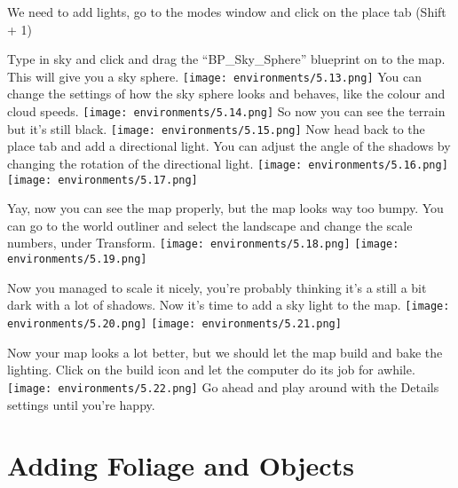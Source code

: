 \documentclass[../main.tex]{subfiles}
\begin{document}
We need to add lights, go to the modes window and click on the place tab (Shift + 1)

Type in sky and click and drag the “BP_Sky_Sphere” blueprint on to the map. This will give you a sky sphere.
\texttt{[image: environments/5.13.png]}
You can change the settings of how the sky sphere looks and behaves, like the colour and cloud speeds.
\texttt{[image: environments/5.14.png]}
So now you can see the terrain but it’s still black.
\texttt{[image: environments/5.15.png]}
Now head back to the place tab and add a directional light. You can adjust the angle of the shadows by changing the rotation of the directional light.
\texttt{[image: environments/5.16.png]}
\texttt{[image: environments/5.17.png]}

Yay, now you can see the map properly, but the map looks way too bumpy. You can go to the world outliner and select the landscape and change the scale numbers, under Transform.
\texttt{[image: environments/5.18.png]}
\texttt{[image: environments/5.19.png]}

Now you managed to scale it nicely, you’re probably thinking it’s a still a bit dark with a lot of shadows. Now it’s time to add a sky light to the map.
\texttt{[image: environments/5.20.png]}
\texttt{[image: environments/5.21.png]}

Now your map looks a lot better, but we should let the map build and bake the lighting.
Click on the build icon and let the computer do its job for awhile.
\texttt{[image: environments/5.22.png]}
Go ahead and play around with the Details settings until you’re happy.

\section {Adding Foliage and Objects}
\end{document}
